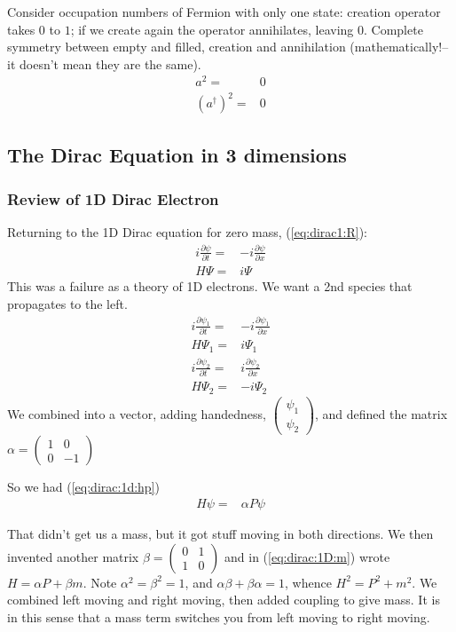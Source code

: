 \documentclass[]{article}
\begin{document}
Consider occupation numbers of Fermion with only one state: creation operator takes $0$ to $1$; if we create again the operator  annihilates, leaving $0$. Complete symmetry between empty and filled, creation and annihilation (mathematically!--it doesn't mean they are the same).
\begin{align*}
	a^2=&0\\
	(a^\dagger)^2=&0
\end{align*}


\subsection{The Dirac Equation in 3 dimensions}

\subsubsection{Review of 1D Dirac Electron}

Returning to the 1D Dirac equation for zero mass, (\ref{eq:dirac1:R}):
\begin{align*}
	i \frac{\partial \psi}{\partial t}=& -i \frac{\partial \psi}{\partial x} \\
	H \Psi =& i \Psi
\end{align*}
This was a failure as a theory of 1D electrons. We want a 2nd species that propagates to the left.
\begin{align*}
	i \frac{\partial \psi_1}{\partial t}=& -i \frac{\partial \psi_1}{\partial x} \\
	H \Psi_1 =& i \Psi_1\\
	i \frac{\partial \psi_2}{\partial t}=& i \frac{\partial \psi_2}{\partial x} \\
	H \Psi_2 =& -i \Psi_2
\end{align*}
We combined into a vector, adding handedness, $\begin{pmatrix} \psi_1\\ \psi_2 \end{pmatrix}$, and defined the matrix $\alpha = \begin{pmatrix}
1&0\\
0&-1
\end{pmatrix}$

So we had (\ref{eq:dirac:1d:hp})
\begin{align*}
	H \psi =& \alpha P \psi
\end{align*}

That didn't get us a mass, but it got stuff moving in both directions. We then invented another matrix $\beta=\begin{pmatrix}
0&1\\
1&0
\end{pmatrix}$ and in (\ref{eq:dirac:1D:m}) wrote $H = \alpha P + \beta m$. Note $\alpha^2=\beta^2=1$, and $\alpha\beta + \beta\alpha=1$, whence $H^2=P^2+m^2$. We combined left moving and right moving, then added coupling to give mass. It is in this sense that a mass term switches you from left moving to right moving.
\end{document}
